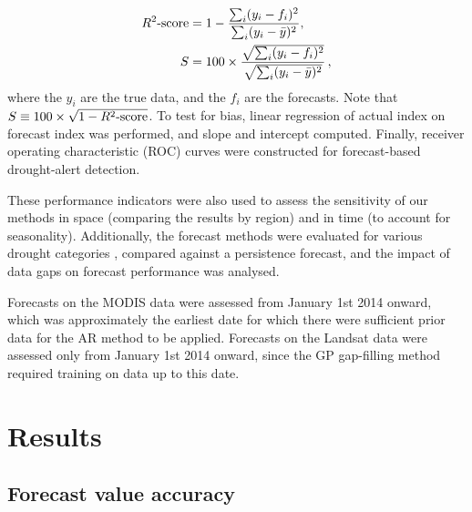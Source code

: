 \documentclass[review]{elsarticle}
\begin{document}
\begin{align}
	R^2{\text -}{\rm score} &= 1 - \frac{\sum_i (y_i - f_i)^2 }{\sum_i (y_i - \bar{y})^2}, \label{eq:r2} \\
	S &= 100 \times \frac{\sqrt{ \sum_i (y_i-f_i)^2 }}{\sqrt{  \sum_i (y_i-\bar{y})^2 }} \label{eq:S}\,,
\end{align}
where the $y_i$ are the true data, and the $f_i$ are the forecasts. Note that $S\equiv 100\times\sqrt{1-R^2{\text -}\rm{score}}$. To test for bias, linear regression of actual index on forecast index was performed, and slope and intercept computed. Finally, receiver operating characteristic (ROC) curves were constructed for forecast-based drought-alert detection. 

These performance indicators were also used to assess the sensitivity of our methods in space (comparing the results by region) and in time (to account for seasonality). Additionally, the forecast methods were evaluated for various drought categories \citep{rs8040267}, compared against a persistence forecast, and the impact of data gaps on forecast performance was analysed.

Forecasts on the MODIS data were assessed from January 1st 2014 onward, which was approximately the earliest date for which there were sufficient prior data for the AR method to be applied. Forecasts on the Landsat data were assessed only from January 1st 2014 onward, since the GP gap-filling method required training on data up to this date.

\section{Results} \label{sec:results}

\subsection{Forecast value accuracy}
\end{document}

